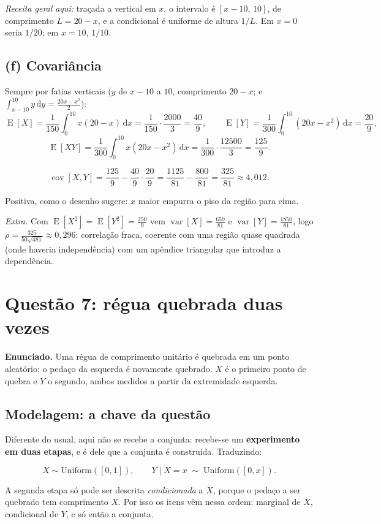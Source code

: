 \documentclass[11pt,a4paper]{article}
\newcommand{\dd}{\,\mathrm{d}}
\DeclareMathOperator{\E}{E}
\DeclareMathOperator{\var}{var}
\DeclareMathOperator{\cov}{cov}
\begin{document}
\emph{Receita geral aqui:} traçada a vertical em $x$, o intervalo é $[x-10,\,10]$,
de comprimento $L=20-x$, e a condicional é uniforme de altura $1/L$. Em $x=0$
seria $1/20$; em $x=10$, $1/10$.

\subsection*{(f) Covariância}

Sempre por fatias verticais ($y$ de $x-10$ a $10$, comprimento $20-x$; e
$\int_{x-10}^{10} y\dd y=\frac{20x-x^2}{2}$):
\[
\E[X]=\frac1{150}\int_0^{10}\! x(20-x)\dd x=\frac1{150}\cdot\frac{2000}{3}=\frac{40}{9},
\qquad
\E[Y]=\frac1{300}\int_0^{10}\!(20x-x^2)\dd x=\frac{20}{9},
\]
\[
\E[XY]=\frac1{300}\int_0^{10}\! x(20x-x^2)\dd x
=\frac1{300}\cdot\frac{12500}{3}=\frac{125}{9}.
\]

\begin{resp}
\[
\cov[X,Y]=\frac{125}{9}-\frac{40}{9}\cdot\frac{20}{9}
=\frac{1125}{81}-\frac{800}{81}=\frac{325}{81}\approx 4{,}012 .
\]
\end{resp}

Positiva, como o desenho sugere: $x$ maior empurra o piso da região para cima.

\emph{Extra.} Com $\E[X^2]=\E[Y^2]=\frac{250}{9}$ vem $\var[X]=\frac{650}{81}$ e
$\var[Y]=\frac{1850}{81}$, logo
$\rho=\frac{325}{50\sqrt{481}}\approx0{,}296$: correlação fraca, coerente com uma
região quase quadrada (onde haveria independência) com um apêndice triangular que
introduz a dependência.

\clearpage
\section{Questão 7: régua quebrada duas vezes}

\textbf{Enunciado.} Uma régua de comprimento unitário é quebrada em um ponto
aleatório; o pedaço da esquerda é novamente quebrado. $X$ é o primeiro ponto de
quebra e $Y$ o segundo, ambos medidos a partir da extremidade esquerda.

\subsection*{Modelagem: a chave da questão}

Diferente do usual, aqui não se recebe a conjunta: recebe-se um \textbf{experimento
em duas etapas}, e é dele que a conjunta é construída. Traduzindo:
\begin{resp}
\[
X\sim\text{Uniform}([0,1]),
\qquad
Y\mid X=x \;\sim\; \text{Uniform}([0,x]).
\]
\end{resp}
A segunda etapa só pode ser descrita \emph{condicionada} a $X$, porque o pedaço a
ser quebrado tem comprimento $X$. Por isso os itens vêm nessa ordem: marginal de
$X$, condicional de $Y$, e só então a conjunta.
\end{document}
